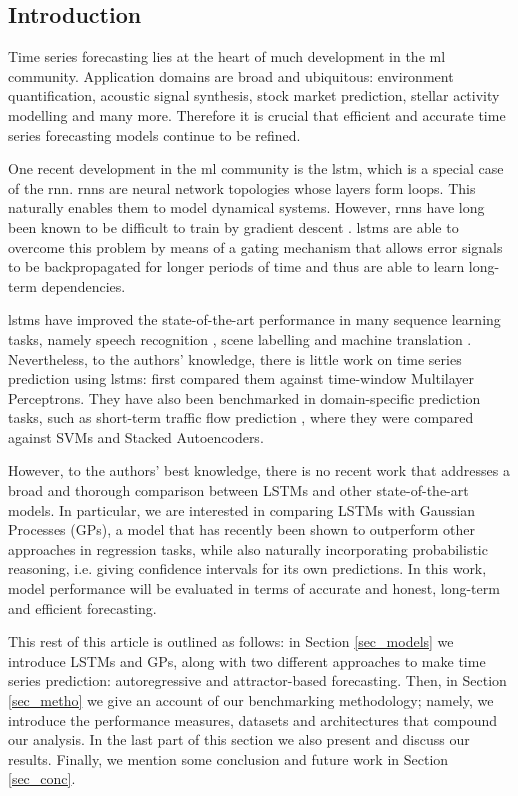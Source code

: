 \documentclass[pdftex,10pt,a4paper,journal]{article}
\theoremstyle{definition}
\theoremstyle{remark}
\begin{document}
\begin{multicols}{2}
\section{Introduction}
Time series forecasting lies at the heart of much development in the \acrfull*{ml} community. Application domains are broad and ubiquitous: environment quantification, acoustic signal synthesis, stock market prediction, stellar activity modelling and many more. Therefore it is crucial that efficient and accurate time series forecasting models continue to be refined.
\par One recent development in the \acrshort*{ml} community is the \acrfull*{lstm}, which is a special case of the \acrfull*{rnn}. \acrshort*{rnn}s are neural network topologies whose layers form loops. This naturally enables them to model dynamical systems. However, \acrshort*{rnn}s have long been known to be difficult to train by gradient descent \cite{Pascanu2012}. \acrshort*{lstm}s are able to overcome this problem by means of a gating mechanism that allows error signals to be backpropagated for longer periods of time and thus are able to learn long-term dependencies.
\par \acrshort*{lstm}s have improved the state-of-the-art performance in many sequence learning tasks, namely speech recognition \cite{Graves2013,Beaufays2014}, scene labelling \cite{Long2014} and machine translation \cite{Sutskever2014}. Nevertheless, to the authors' knowledge, there is little work on time series prediction using \acrshort*{lstm}s: \cite{Gers2002} first compared them against time-window Multilayer Perceptrons. They have also been benchmarked in domain-specific prediction tasks, such as short-term traffic flow prediction \cite{Tian2015}, where they were compared against SVMs and Stacked Autoencoders. 
\par However, to the authors' best knowledge, there is no recent work that addresses a broad and thorough comparison between LSTMs and other state-of-the-art models. In particular, we are interested in comparing LSTMs with Gaussian Processes (GPs), a model that has recently been shown to outperform other approaches in regression tasks, while also naturally incorporating probabilistic reasoning, i.e. giving confidence intervals for its own predictions. In this work, model performance will be evaluated in terms of accurate and honest, long-term and efficient forecasting.
\par This rest of this article is outlined as follows: in Section \ref{sec_models} we introduce LSTMs and GPs, along with two different approaches to make time series prediction: autoregressive and attractor-based forecasting. Then, in Section \ref{sec_metho} we give an account of our benchmarking methodology; namely, we introduce the performance measures, datasets and architectures that compound our analysis. In the last part of this section we also present and discuss our results. Finally, we mention some conclusion and future work in Section \ref{sec_conc}.



\end{multicols}
\end{document}
